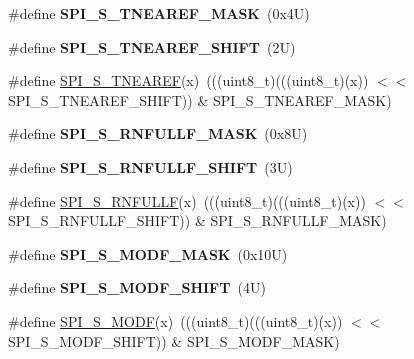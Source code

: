 \begin{DoxyCompactItemize}
\#define {\bfseries S\+P\+I\+\_\+\+S\+\_\+\+T\+N\+E\+A\+R\+E\+F\+\_\+\+M\+A\+SK}~(0x4\+U)
\item 
\mbox{\label{group___s_p_i___register___masks_ga56cdf841cf65c418a9355ca1d5ff5d70}} 
\#define {\bfseries S\+P\+I\+\_\+\+S\+\_\+\+T\+N\+E\+A\+R\+E\+F\+\_\+\+S\+H\+I\+FT}~(2\+U)
\item 
\#define \mbox{\hyperlink{group___s_p_i___register___masks_ga6f0b73e25378755dcb64718f8145ad60}{S\+P\+I\+\_\+\+S\+\_\+\+T\+N\+E\+A\+R\+EF}}(x)~(((uint8\+\_\+t)(((uint8\+\_\+t)(x)) $<$$<$ S\+P\+I\+\_\+\+S\+\_\+\+T\+N\+E\+A\+R\+E\+F\+\_\+\+S\+H\+I\+FT)) \& S\+P\+I\+\_\+\+S\+\_\+\+T\+N\+E\+A\+R\+E\+F\+\_\+\+M\+A\+SK)
\item 
\mbox{\label{group___s_p_i___register___masks_ga9706f3e0047e012ce5a97501517719a6}} 
\#define {\bfseries S\+P\+I\+\_\+\+S\+\_\+\+R\+N\+F\+U\+L\+L\+F\+\_\+\+M\+A\+SK}~(0x8\+U)
\item 
\mbox{\label{group___s_p_i___register___masks_ga3b0543127ae3a9718b758fa07bbe97a0}} 
\#define {\bfseries S\+P\+I\+\_\+\+S\+\_\+\+R\+N\+F\+U\+L\+L\+F\+\_\+\+S\+H\+I\+FT}~(3\+U)
\item 
\#define \mbox{\hyperlink{group___s_p_i___register___masks_ga8d05724bb0722e629bd5f1918f512986}{S\+P\+I\+\_\+\+S\+\_\+\+R\+N\+F\+U\+L\+LF}}(x)~(((uint8\+\_\+t)(((uint8\+\_\+t)(x)) $<$$<$ S\+P\+I\+\_\+\+S\+\_\+\+R\+N\+F\+U\+L\+L\+F\+\_\+\+S\+H\+I\+FT)) \& S\+P\+I\+\_\+\+S\+\_\+\+R\+N\+F\+U\+L\+L\+F\+\_\+\+M\+A\+SK)
\item 
\mbox{\label{group___s_p_i___register___masks_gae3b092b4e35b25cabf209f60637cb1f8}} 
\#define {\bfseries S\+P\+I\+\_\+\+S\+\_\+\+M\+O\+D\+F\+\_\+\+M\+A\+SK}~(0x10\+U)
\item 
\mbox{\label{group___s_p_i___register___masks_ga1a037c05626e7bd1f84704dd98d620b9}} 
\#define {\bfseries S\+P\+I\+\_\+\+S\+\_\+\+M\+O\+D\+F\+\_\+\+S\+H\+I\+FT}~(4\+U)
\item 
\#define \mbox{\hyperlink{group___s_p_i___register___masks_ga35c6bf0dca26cdb4c3f470f4db55153f}{S\+P\+I\+\_\+\+S\+\_\+\+M\+O\+DF}}(x)~(((uint8\+\_\+t)(((uint8\+\_\+t)(x)) $<$$<$ S\+P\+I\+\_\+\+S\+\_\+\+M\+O\+D\+F\+\_\+\+S\+H\+I\+FT)) \& S\+P\+I\+\_\+\+S\+\_\+\+M\+O\+D\+F\+\_\+\+M\+A\+SK)
$$
\end{DoxyCompactItemize}
